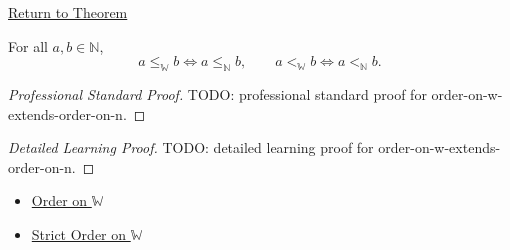 \newpage
{}
\label{prf:order-on-w-extends-order-on-n}

\begin{remark*}[Return]
\hyperref[thm:order-on-w-extends-order-on-n]{Return to Theorem}
\end{remark*}

\begin{theorem*}
For all $a,b\in\mathbb{N}$,
\[
a\leq_{\mathbb{W}}b\Longleftrightarrow a\leq_{\mathbb{N}}b,
\qquad
a<_{\mathbb{W}}b\Longleftrightarrow a<_{\mathbb{N}}b.
\]
\end{theorem*}

\begin{proof}[Professional Standard Proof]
\LRAProofBodyStart
TODO: professional standard proof for order-on-w-extends-order-on-n.
\end{proof}

\begin{proof}[Detailed Learning Proof]
\LRAProofBodyStart
TODO: detailed learning proof for order-on-w-extends-order-on-n.
\end{proof}

\begin{remark*}
\end{remark*}

\begin{dependencies}
\begin{itemize}
  \item \hyperref[def:order-on-w]{Order on $\mathbb{W}$}
  \item \hyperref[def:strict-order-on-w]{Strict Order on $\mathbb{W}$}
\end{itemize}
\end{dependencies}

\clearpage
